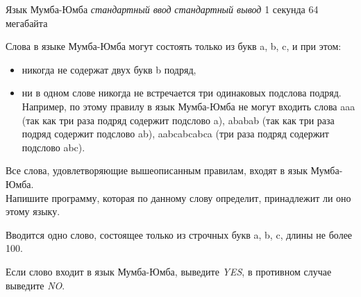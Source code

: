 \begin{problem}%
{Язык Мумба-Юмба}%
{\textsl{стандартный ввод}}%
{\textsl{стандартный вывод}}%
{1 секунда}%
{64 мегабайта}{}

Слова в языке Мумба-Юмба могут состоять только из букв a, b, c, и при этом:

\begin{itemize}
\item никогда не содержат двух букв b подряд,
\item ни в одном слове никогда не встречается три одинаковых подслова подряд. Например, по этому правилу в язык Мумба-Юмба не могут входить слова aaa (так как три раза подряд содержит подслово a), ababab (так как три раза подряд содержит подслово ab), aabcabcabca (три раза подряд содержит подслово abc).
\end{itemize}

Все слова, удовлетворяющие вышеописанным правилам, входят в язык Мумба-Юмба.\\

Напишите программу, которая по данному слову определит, принадлежит ли оно этому языку.

\InputFile

Вводится одно слово, состоящее только из строчных букв a, b, c, длины не более 100.

\OutputFile

Если слово входит в язык Мумба-Юмба, выведите \textit{YES}, в противном случае выведите \textit{NO}.

\Examples

\begin{example}
%
%
\end{example}
\end{problem}